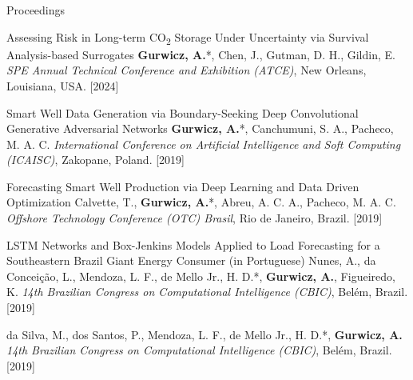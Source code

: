 \begin{cvcontentsection}{Proceedings}

\cvpublication
    {Assessing Risk in Long-term CO\textsubscript{2} Storage Under Uncertainty via Survival Analysis-based Surrogates}
    {\textbf{Gurwicz, A.}*, Chen, J., Gutman, D. H., Gildin, E.}
    {\textit{SPE Annual Technical Conference and Exhibition (ATCE)}, New Orleans, Louisiana, USA. }
    [2024]

\cvpublication
    {Smart Well Data Generation via Boundary-Seeking Deep Convolutional Generative Adversarial Networks}
    {\textbf{Gurwicz, A.}*, Canchumuni, S. A., Pacheco, M. A. C.}
    {\textit{International Conference on Artificial Intelligence and Soft Computing (ICAISC)}, Zakopane, Poland. }
    [2019]

\cvpublication
    {Forecasting Smart Well Production via Deep Learning and Data Driven Optimization}
    {Calvette, T., \textbf{Gurwicz, A.}*, Abreu, A. C. A., Pacheco, M. A. C.}
    {\textit{Offshore Technology Conference (OTC) Brasil}, Rio de Janeiro, Brazil. }
    [2019]

\cvpublication
    {LSTM Networks and Box-Jenkins Models Applied to Load Forecasting for a Southeastern Brazil Giant Energy Consumer (in Portuguese)}
    {Nunes, A., da Conceição, L., Mendoza, L. F., de Mello Jr., H. D.*, \textbf{Gurwicz, A.}, Figueiredo, K.}
    {\textit{14th Brazilian Congress on Computational Intelligence (CBIC)}, Belém, Brazil. }
    [2019]

    {da Silva, M., dos Santos, P., Mendoza, L. F., de Mello Jr., H. D.*, \textbf{Gurwicz, A.}}
    {\textit{14th Brazilian Congress on Computational Intelligence (CBIC)}, Belém, Brazil. }
    [2019]

\end{cvcontentsection}

